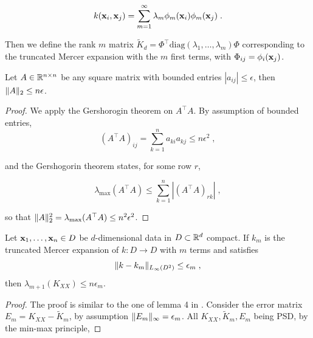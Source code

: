 \documentclass{article}
\begin{document}
{\begin{equation*}
    k(\boldsymbol{\mathbf{x}}_i, \boldsymbol{\mathbf{x}}_j) = \sum_{m=1}^\infty \lambda_m \phi_m(\boldsymbol{\mathbf{x}}_i) \phi_m(\boldsymbol{\mathbf{x}}_j) \;.
\end{equation*}

Then we define the rank $m$ matrix $\tilde K_d = \Phi^\top \text{diag}(\lambda_1, \ldots, \lambda_m) \Phi$ corresponding to the truncated Mercer expansion with the $m$ first terms, with $\Phi_{ij} = \phi_i(\boldsymbol{\mathbf{x}}_j)$.

\begin{proposition} \label{thm:gershogorin}
Let $A \in \mathbb R^{n \times n}$ be any square matrix with bounded entries $|a_{ij}| \le \epsilon$, then $\Vert A \Vert_2 \le n\epsilon$.
\end{proposition}
\begin{proof}
We apply the Gershorogin theorem on $A^\top A$. By assumption of bounded entries, 
\begin{equation*}
    (A^\top A)_{ij} = \textstyle\sum_{k=1}^n a_{ki} a_{kj} \le n\epsilon^2 \; ,
\end{equation*}

and the Gershogorin theorem states, for some row $r$,

\begin{equation*}
    \lambda_{\max}(A^\top A) \le \textstyle\sum_{k=1}^n |(A^\top A)_{rk}| \; ,
\end{equation*}

so that $\Vert A \Vert_2^2 = \lambda_{\max}(A^\top A) \le n^2\epsilon^2$.
\end{proof}

\begin{proposition}
Let $\boldsymbol{\mathbf{x}}_1, \ldots, \boldsymbol{\mathbf{x}}_n \in D$ be $d$-dimensional data in $D \subset \mathbb R^d$ compact.
If $k_m$ is the truncated Mercer expansion of $k: D\to D$ with $m$ terms and satisfies 
\begin{equation*}
    \Vert k - k_m \Vert_{L_\infty (D^2)} \le \epsilon_m \;,
\end{equation*}
then $\lambda_{m+1}(K_{XX}) \le n \epsilon_m$.
\end{proposition}
\begin{proof}
The proof is similar to the one of lemma 4 in \cite{gardner_gpytorch_2021}. Consider the error matrix $E_m = K_{XX} - \tilde K_m$, by assumption $\Vert E_m \Vert_\infty = \epsilon_m$. All $K_{XX}, \tilde K_m, E_m$ being PSD, by the min-max principle,


\end{proof}}
\end{document}

